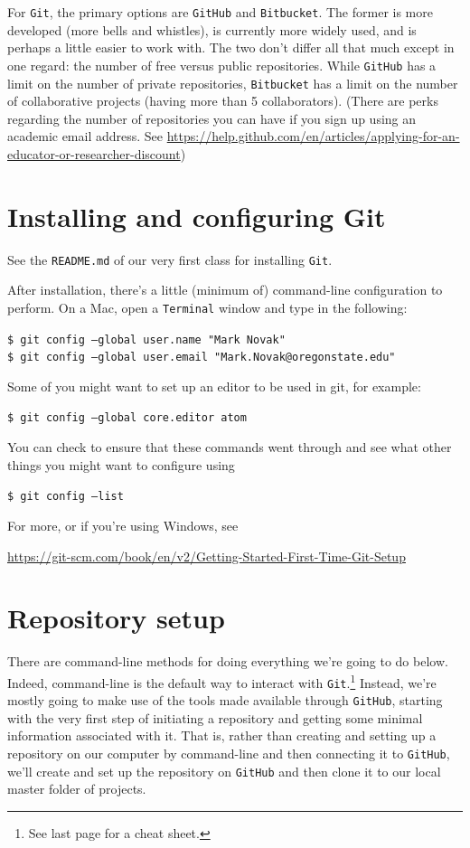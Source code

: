 \documentclass[12pt,letterpaper]{article}
\begin{document}
For \texttt{Git}, the primary options are \texttt{GitHub} and 
\texttt{Bitbucket}.
The former is more developed (more bells and whistles), is currently more widely used, and is perhaps a little easier to work with.
The two don't differ all that much except in one regard:  the number of free versus public repositories.
While \texttt{GitHub} has a limit on the number of private repositories, 
\texttt{Bitbucket} has a limit on the number of collaborative projects (having 
more than 5 collaborators).
(There are perks regarding the number of repositories you can have if you sign up using an academic email address.  See \url{https://help.github.com/en/articles/applying-for-an-educator-or-researcher-discount})



\section{Installing and configuring Git}
See the \texttt{README.md} of our very first class for installing \texttt{Git}.

After installation, there's a little (minimum of) command-line configuration to perform.
On a Mac, open a \texttt{Terminal} window and type in the following:

\noindent
     \texttt{\$ git config --global user.name "Mark Novak"}\\
     \texttt{\$ git config --global user.email "Mark.Novak@oregonstate.edu"}

\noindent
Some of you might want to set up an editor to be used in git, for example:

\noindent
	\texttt{\$ git config --global core.editor atom}

\noindent
You can check to ensure that these commands went through and see what other things you might want to configure using

\noindent
\texttt{\$ git config --list}

\noindent
For more, or if you're using Windows, see\\
\begin{footnotesize}
\url{https://git-scm.com/book/en/v2/Getting-Started-First-Time-Git-Setup}
\end{footnotesize}




\section{Repository setup}
There are command-line methods for doing everything we're going to do below.
Indeed, command-line is the default way to interact with \texttt{Git}.\footnote{See last page for a cheat sheet.}
Instead, we're mostly going to make use of the tools made available through 
\texttt{GitHub}, starting with the very first step of initiating a repository and 
getting some minimal information associated with it.
That is, rather than creating and setting up a repository on our computer by 
command-line and then connecting it to \texttt{GitHub}, we'll create and set up 
the repository on \texttt{GitHub} and then clone it to our local master folder of 
projects.
\end{document}

